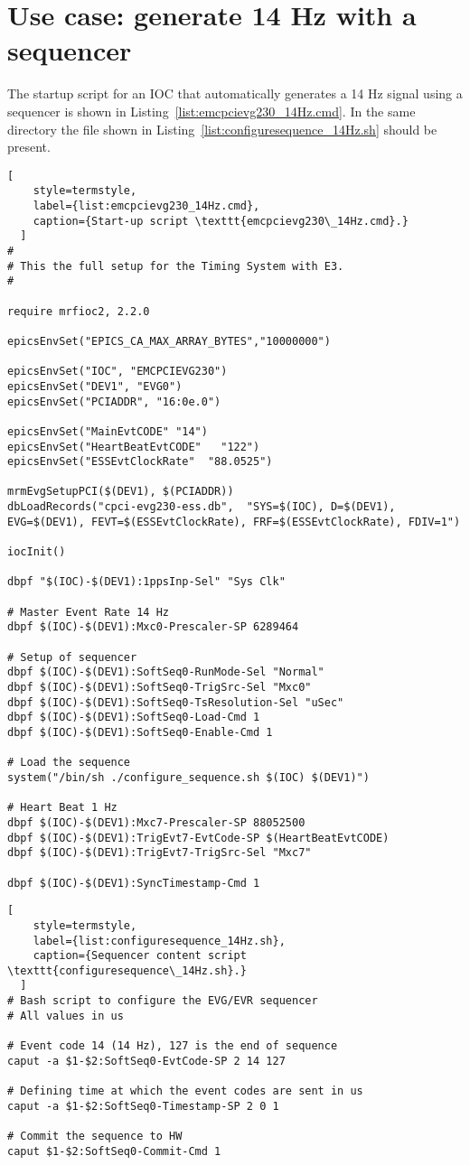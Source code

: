 \documentclass[11pt
  , a4paper
  , article
  , oneside
  , showtrims
]{memoir}
\begin{document}
\newpage
\chapter{Use case: generate 14 Hz with a sequencer}
The startup script for an IOC that automatically generates a 14 Hz signal using a sequencer is shown in Listing~\ref{list:emcpcievg230_14Hz.cmd}. In the same directory the file shown in Listing~\ref{list:configuresequence_14Hz.sh} should be present.
\begin{lstlisting}[
    style=termstyle,
    label={list:emcpcievg230_14Hz.cmd},
    caption={Start-up script \texttt{emcpcievg230\_14Hz.cmd}.}
  ]
#
# This the full setup for the Timing System with E3.
#

require mrfioc2, 2.2.0

epicsEnvSet("EPICS_CA_MAX_ARRAY_BYTES","10000000")

epicsEnvSet("IOC", "EMCPCIEVG230")
epicsEnvSet("DEV1", "EVG0")
epicsEnvSet("PCIADDR", "16:0e.0")

epicsEnvSet("MainEvtCODE" "14")
epicsEnvSet("HeartBeatEvtCODE"   "122")
epicsEnvSet("ESSEvtClockRate"  "88.0525")

mrmEvgSetupPCI($(DEV1), $(PCIADDR))
dbLoadRecords("cpci-evg230-ess.db",  "SYS=$(IOC), D=$(DEV1), EVG=$(DEV1), FEVT=$(ESSEvtClockRate), FRF=$(ESSEvtClockRate), FDIV=1")

iocInit()

dbpf "$(IOC)-$(DEV1):1ppsInp-Sel" "Sys Clk"

# Master Event Rate 14 Hz
dbpf $(IOC)-$(DEV1):Mxc0-Prescaler-SP 6289464

# Setup of sequencer
dbpf $(IOC)-$(DEV1):SoftSeq0-RunMode-Sel "Normal"
dbpf $(IOC)-$(DEV1):SoftSeq0-TrigSrc-Sel "Mxc0"
dbpf $(IOC)-$(DEV1):SoftSeq0-TsResolution-Sel "uSec"
dbpf $(IOC)-$(DEV1):SoftSeq0-Load-Cmd 1
dbpf $(IOC)-$(DEV1):SoftSeq0-Enable-Cmd 1

# Load the sequence
system("/bin/sh ./configure_sequence.sh $(IOC) $(DEV1)")

# Heart Beat 1 Hz
dbpf $(IOC)-$(DEV1):Mxc7-Prescaler-SP 88052500
dbpf $(IOC)-$(DEV1):TrigEvt7-EvtCode-SP $(HeartBeatEvtCODE)
dbpf $(IOC)-$(DEV1):TrigEvt7-TrigSrc-Sel "Mxc7"

dbpf $(IOC)-$(DEV1):SyncTimestamp-Cmd 1
\end{lstlisting}

\begin{lstlisting}[
    style=termstyle,
    label={list:configuresequence_14Hz.sh},
    caption={Sequencer content script \texttt{configuresequence\_14Hz.sh}.}
  ]
# Bash script to configure the EVG/EVR sequencer
# All values in us

# Event code 14 (14 Hz), 127 is the end of sequence
caput -a $1-$2:SoftSeq0-EvtCode-SP 2 14 127

# Defining time at which the event codes are sent in us
caput -a $1-$2:SoftSeq0-Timestamp-SP 2 0 1

# Commit the sequence to HW
caput $1-$2:SoftSeq0-Commit-Cmd 1
\end{lstlisting}

\clearpage
\backmatter
%
%
%

%

\end{document}

